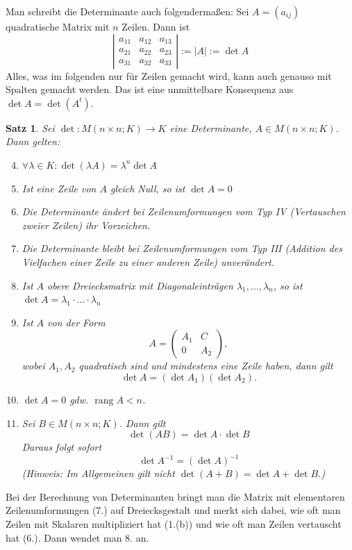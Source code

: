 \documentclass[12pt,a4paper]{article}
\theoremstyle{plain}
\newtheorem{Satz}[Theorem]{Satz}
\numberwithin{equation}{section}
\begin{document}
Man schreibt die Determinante auch folgendermaßen: Sei $A=(a_{ij})$ quadratische Matrix mit $n$ Zeilen. Dann ist
\[\left\lvert\begin{matrix}a_{11}&a_{12}&a_{13}\\ a_{21}&a_{22}&a_{23}\\ a_{31}&a_{32}&a_{33}\end{matrix}\right\rvert :=\lvert A\rvert :=\det A\]
Alles, was im folgenden nur für Zeilen gemacht wird, kann auch genauso mit Spalten gemacht werden. Das ist eine unmittelbare Konsequenz aus $\det A=\det(A^t)$.
\begin{Satz}
Sei $\det\colon M(n\times n;K)\rightarrow K$ eine Determinante, $A\in M(n\times n;K)$. Dann gelten:
\begin{enumerate}
\setcounter{enumi}{3}
\item $\forall \lambda\in K\colon \det (\lambda A)=\lambda^n\det A$
\item Ist eine Zeile von $A$ gleich Null, so ist $\det A=0$
\item Die Determinante ändert bei Zeilenumformungen vom Typ IV (Vertauschen zweier Zeilen) ihr Vorzeichen.
\item Die Determinante bleibt bei Zeilenumformungen vom Typ III (Addition des Vielfachen einer Zeile zu einer anderen Zeile) unverändert.
\item Ist $A$ obere Dreiecksmatrix mit Diagonaleinträgen $\lambda_1,...,\lambda_n$, so ist $\det A=\lambda_1\cdot...\cdot\lambda_n$
\item Ist $A$ von der Form
\[A=\begin{pmatrix} A_1&C\\0&A_2\end{pmatrix},\]
wobei $A_1,A_2$ quadratisch sind und mindestens eine Zeile haben, dann gilt
\[\det A=(\det A_1)(\det A_2).\]
\item $\det A=0$ gdw. $\operatorname{rang} A<n$.
\item Sei $B\in M(n\times n;K)$. Dann gilt
\[\det(AB)=\det A\cdot\det B\]
Daraus folgt sofort
\[\det A^{-1}=(\det A)^{-1}\]
(Hinweis: Im Allgemeinen gilt nicht $\det(A+B)=\det A +\det B$.)
\end{enumerate}
\end{Satz}
Bei der Berechnung von Determinanten bringt man die Matrix mit elementaren Zeilenumformungen (7.) auf Dreiecksgestalt und merkt sich dabei, wie oft man Zeilen mit Skalaren multipliziert hat (1.(b)) und wie oft man Zeilen vertauscht hat (6.). Dann wendet man 8. an.
\end{document}
